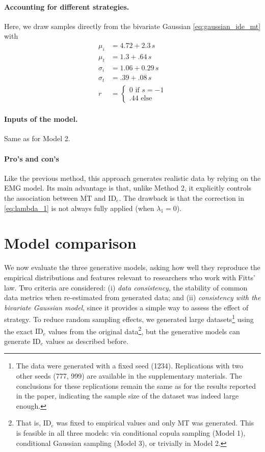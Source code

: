 \documentclass[acmlarge, manuscript,review]{acmart}
\newcommand{\mmt}{\ensuremath{\overline{\mt}}\xspace}
\newcommand{\mt}{\ensuremath{{\text{MT}}}\xspace}
\newcommand{\ide}{\ensuremath{{\text{ID}_e}}\xspace}
\begin{document}
\paragraph{Accounting for different strategies.} Here, we draw samples directly from the bivariate Gaussian \autoref{eq:gaussian_ide_mt} with
\begin{align}
	\mu_i    & = 4.72 + 2.3\,s        \\
	\mu_t    & = 1.3 + .64\,s         \\
	\sigma_i & = 1.06 + 0.29\,s       \\
	\sigma_t & = .39 + .08\,s         \\
	r        & = \begin{cases}
		             0 \text{ if } s = -1 \\
		             .44 \text{ else}
	             \end{cases}
\end{align}

\paragraph{Inputs of the model.} Same as for Model 2.

\paragraph{Pro's and con's} 
Like the previous method, this approach generates realistic data by relying on the EMG model. Its main advantage is that, unlike Method 2, it explicitly controls the association between \mmt and \ide. The drawback is that the correction in \autoref{eq:lambda_1} is not always fully applied (\ie when $\lambda_1 = 0$).




\section{Model comparison}
We now evaluate the three generative models, asking how well they reproduce the empirical distributions and features relevant to researchers who work with Fitts' law. Two criteria are considered: (i) \textit{data consistency}, the stability of common data metrics when re-estimated from generated data; and (ii) \textit{consistency with the bivariate Gaussian model}, since it provides a simple way to assess the effect of strategy. To reduce random sampling effects, we generated large datasets\footnote{The data were generated with a fixed seed (1234). Replications with two other seeds (777, 999) are available in the supplementary materials. The conclusions for these replications remain the same as for the results reported in the paper, indicating the sample size of the dataset was indeed large enough.} using the exact \ide values from the original data\footnote{That is, \ide was fixed to empirical values and only MT was generated. This is feasible in all three models: via conditional copula sampling (Model 1), conditional Gaussian sampling (Model 3), or trivially in Model 2.}, but the generative models can generate \ide values as described before.
\end{document}
